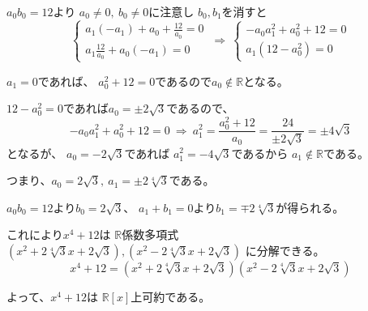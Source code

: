 \documentclass[12pt,b5paper]{ltjsarticle}
\begin{document}
\begin{enumerate}
       $a_{0} b_{0}=12$より
       $a_{0}\ne 0,\ b_{0}\ne0$に注意し
       $b_0,b_1$を消すと
       \begin{equation}
        \begin{cases}
         a_{1} (-a_{1}) + a_{0} + \frac{12}{a_{0}}=0\\
         a_{1} \frac{12}{a_{0}} + a_{0} (-a_{1})=0
        \end{cases}
        \ \Rightarrow \
        \begin{cases}
         -a_{0} a_{1}^2 + a_{0}^2 + 12 =0\\
         a_{1} (12 - a_{0}^2 )=0
        \end{cases}
       \end{equation}

       $a_{1}=0$であれば、
       $a_{0}^2+12=0$であるので$a_{0}\not\in\mathbb{R}$となる。

       $12-a_{0}^2=0$であれば$a_{0}=\pm 2\sqrt{3}$であるので、
       \begin{equation}
        -a_{0} a_{1}^2 + a_{0}^2 + 12 =0
        \ \Rightarrow \
         a_{1}^2 = \frac{ a_{0}^2 + 12 }{a_{0}}
         = \frac{ 24 }{\pm 2\sqrt{3}}
         = \pm 4\sqrt{3}
       \end{equation}
       となるが、
       $a_{0}=- 2\sqrt{3}$であれば
       $a_{1}^2=-4\sqrt{3}$であるから
       $a_{1}\not\in\mathbb{R}$である。

       つまり、$a_{0}= 2\sqrt{3},\ a_{1}=\pm2\sqrt[4]{3}$である。

       $a_{0} b_{0}=12$より$b_{0}= 2\sqrt{3}$、
       $a_{1} + b_{1}=0$より$b_{1}=\mp 2\sqrt[4]{3}$が得られる。

       これにより$x^{4}+12$は
       $\mathbb{R}$係数多項式
       ${\left(x^{2} + 2 \sqrt[4]{3} x + 2 \sqrt{3}\right)},
       {\left(x^{2} - 2 \sqrt[4]{3} x + 2 \sqrt{3}\right)}$
       に分解できる。
       \begin{equation}
        x^{4} + 12
         =
         {\left(x^{2} + 2 \sqrt[4]{3} x + 2 \sqrt{3}\right)}
         {\left(x^{2} - 2 \sqrt[4]{3} x + 2 \sqrt{3}\right)}
       \end{equation}

       よって、$x^{4}+12$は
       $\mathbb{R}[x]$上可約である。


       \hrulefill

\end{enumerate}

\hrulefill
\end{document}
